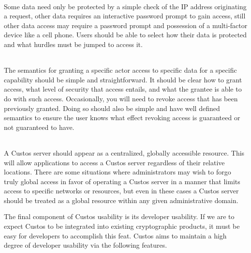 \begin{packed_desc}
\item[Flexible Authentication Mechanisms] \hfill \\ Some data need
  only be protected by a simple check of the IP address originating a
  request, other data requires an interactive password prompt to gain
  access, still other data access may require a password prompt and
  possession of a multi-factor device like a cell phone. Users should
  be able to select how their data is protected and what hurdles must
  be jumped to access it.
\item[Simple Access Control] \hfill \\ The semantics for granting a
  specific actor access to specific data for a specific capability
  should be simple and straightforward. It should be clear how to
  grant access, what level of security that access entails, and what
  the grantee is able to do with such access. Occasionally, you will
  need to revoke access that has been previously granted. Doing so
  should also be simple and have well defined semantics to ensure the
  user knows what effect revoking access is guaranteed or not
  guaranteed to have.
\item[Logical Centralization] \hfill \\ A Custos server should appear
  as a centralized, globally accessible resource. This will allow
  applications to access a Custos server regardless of their relative
  locations. There are some situations where administrators may wish
  to forgo truly global access in favor of operating a Custos server
  in a manner that limits access to specific networks or resources,
  but even in these cases a Custos server should be treated as a
  global resource within any given administrative domain.
\end{packed_desc}

The final component of Custos usability is its developer usability. If
we are to expect Custos to be integrated into existing cryptographic
products, it must be easy for developers to accomplish this
feat. Custos aims to maintain a high degree of developer usability via
the following features.


